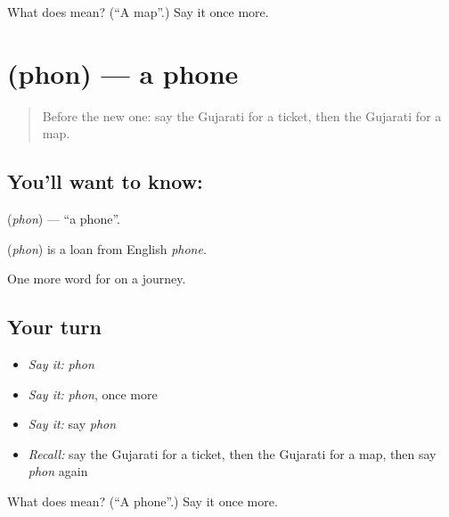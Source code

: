 \begin{tcolorbox}[breakable,colback=teal!4,colframe=teal!35!black,title={Before you move on}]
What does  mean? (\textquotedblleft{}A map\textquotedblright{}.) Say it once more.
\end{tcolorbox}
\section[\texorpdfstring{\gu{ફોન} (phon)}{ફોન (phon)}]{ (phon) — a phone}

\label{lesson:GU-C86-phone}



\begin{quote}
Before the new one: say the Gujarati for a ticket, then the Gujarati for a map.
\end{quote}

\subsection*{You'll want to know: }
\textbf{} (\emph{phon}) — \textquotedblleft{}a phone\textquotedblright{}.

\begin{cousinweb}
\textbf{} (\emph{phon}) is a loan from English \emph{phone}.
\end{cousinweb}

\begin{grammarlens}[title={What you've built}]
One more word for on a journey.
\end{grammarlens}

\subsection*{Your turn}
\begin{itemize}
\raggedright
  \item \emph{Say it:} \emph{phon}
  \item \emph{Say it:} \emph{phon}, once more
  \item \emph{Say it:} say \emph{phon}
  \item \emph{Recall:} say the Gujarati for a ticket, then the Gujarati for a map, then say \emph{phon} again
\end{itemize}

\begin{tcolorbox}[breakable,colback=teal!4,colframe=teal!35!black,title={Before you move on}]
What does  mean? (\textquotedblleft{}A phone\textquotedblright{}.) Say it once more.
\end{tcolorbox}
